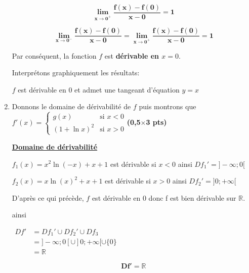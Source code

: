 \documentclass[12pt,a4paper]{article}
\begin{document}
\begin{enumerate}
          \begin{resultbox}
              \[
                  \mathbf{\lim\limits_{x \to 0^+}\frac{f(x)-f(0)}{x-0}=1
                  }
              \]
          \end{resultbox}

          \begin{resultbox}
              \[
                  \mathbf{\lim\limits_{x \to 0^-}\frac{f(x)-f(0)}{x-0}=\lim\limits_{x \to 0^+}\frac{f(x)-f(0)}{x-0}=1
                  }
              \]
          \end{resultbox}

          Par conséquent, la fonction \( f \) est \textbf{dérivable en \( x = 0 \)}.

          Interprétons graphiquement les résultats:

          \( f \) est dérivable en 0 et admet une tangeant d'équation \( y=x \)

    \item Donnons le domaine de dérivabilité de \( f \) puis montrons que
          \(
          f'(x) =
          \begin{cases}
              g(x)          & \text{si } x < 0 \\
              (1 + \ln x)^2 & \text{si } x > 0
          \end{cases}
          \)\hfill \textbf{(0,5$\times$3 pts)}

          \textbf{\underline{Domaine de dérivabilité}}

          \( f_{1}(x)=x^2 \ln(-x) + x + 1 \) est dérivable si \( x < 0 \) ainsi \( Df_{1}' = ]-\infty;0[\)

          \( f_{2}(x)=x \ln(x)^2 + x + 1  \) est dérivable si \(  x > 0 \) ainsi \( Df_{2}' = ]0;+\infty[\)

          D'après ce qui précède, \(f\) est dérivable en 0 donc f est bien dérivable sur \(\mathbb{R}\).

          ainsi

          \(
          \begin{aligned}
              Df' & =Df_{1}' \cup Df_{2}' \cup Df_{3}         \\
                  & =]-\infty;0[ \cup ]0;+\infty[ \cup  \{0\} \\
                  & =\mathbb{R}
          \end{aligned}
          \)

          \begin{resultbox}
              \[
                  \mathbf{Df'=\mathbb{R} }
              \]
          \end{resultbox}


\end{enumerate}
\end{document}
